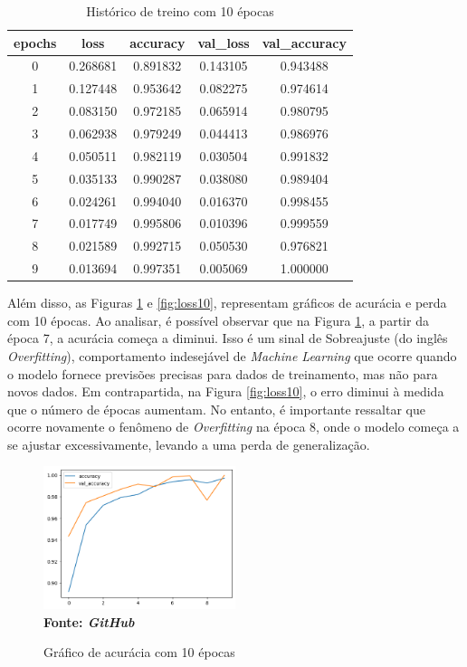 \begin{table}[h]
  \centering
  \caption{Histórico de treino com 10 épocas}
   \label{tab:history10}
\begin{tabular}{|c|c|c|c|c|} 
  \hline
   epochs & loss & accuracy & val\_loss & val\_accuracy \\
  \hline
    0 & 0.268681 & 0.891832 & 0.143105 & 0.943488 \\
    1 & 0.127448 & 0.953642 & 0.082275 & 0.974614 \\
    2 & 0.083150 & 0.972185 & 0.065914 & 0.980795 \\
    3 & 0.062938 & 0.979249 & 0.044413 & 0.986976 \\
    4 & 0.050511 & 0.982119 & 0.030504 & 0.991832 \\
    5 & 0.035133 & 0.990287 & 0.038080 & 0.989404 \\
    6 & 0.024261 & 0.994040 & 0.016370 & 0.998455 \\
    7 & 0.017749 & 0.995806 & 0.010396 & 0.999559 \\
    8 & 0.021589 & 0.992715 & 0.050530 & 0.976821 \\
    9 & 0.013694 & 0.997351 & 0.005069 & 1.000000 \\
  \hline
\end{tabular}

\end{table}

Além disso, as Figuras \ref{fig:acc10} e \ref{fig:loss10}, representam gráficos de acurácia e perda com 10 épocas. Ao analisar, é possível observar que na Figura \ref{fig:acc10}, a partir da época 7, a acurácia começa a diminui. Isso é um sinal de Sobreajuste (do inglês \textit{Overfitting}), comportamento indesejável de \textit{Machine Learning} que ocorre quando o modelo fornece previsões precisas para dados de treinamento, mas não para novos dados. Em contrapartida, na Figura \ref{fig:loss10}, o erro diminui à medida que o número de épocas aumentam. No entanto, é importante ressaltar que ocorre novamente o fenômeno de \textit{Overfitting} na época 8, onde o modelo começa a se ajustar excessivamente, levando a uma perda de generalização. 

\begin{figure}[ht]
 	\centering	
 	\caption[\hspace{0.1cm}Grade Computacional.]{Gráfico de acurácia com 10 épocas}
 	\vspace{-0.4cm}
 	\includegraphics[width=0.5\textwidth]{figuras/accuracy_10.png}
 	\captionsetup{justification=centering}
	\vspace{-0.2cm}
     \\\textbf{\footnotesize Fonte: \textit{GitHub}}
	\label{fig:acc10}
\end{figure}

